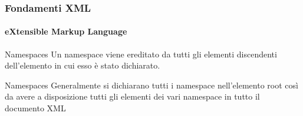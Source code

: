 \begin{frame}
    \frametitle{Fondamenti XML}
    \framesubtitle{eXtensible Markup Language}
    \addtocounter{nframe}{1}

	\begin{block}{Namespaces}
		Un namespace viene ereditato da tutti gli elementi discendenti dell'elemento in cui esso è stato dichiarato.
	\end{block}

	\begin{block}{Namespaces}
		Generalmente si dichiarano tutti i namespace nell'elemento root così da avere a disposizione tutti gli elementi dei vari namespace in tutto il documento XML
	\end{block}

\end{frame}


















